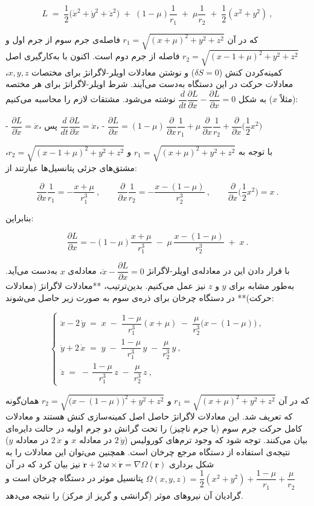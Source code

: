 $$
L \;=\; \dfrac{1}{2}\Big(\dot{x}^2+\dot{y}^2+\dot{z}^2\Big)\;+\;(1-\mu)\dfrac{1}{r_1}\;+\;\mu\dfrac{1}{r_2}\;+\;\dfrac{1}{2}(x^2+y^2)~,
$$

که در آن $r_1=\sqrt{(x+\mu)^2+y^2+z^2}$ فاصله‌ی جرم سوم از جرم اول و $r_2=\sqrt{(x-1+\mu)^2+y^2+z^2}$ فاصله از جرم دوم است. اکنون با به‌کارگیری اصل کمینه‌کردن کنش ($\delta S=0$) و نوشتن معادلات اویلر-لاگرانژ برای مختصات $x, y, z$، معادلات حرکت در این دستگاه به‌دست می‌آیند. شرط اویلر-لاگرانژ برای هر مختصه (مثلاً $x$) به شکل $\dfrac{d}{dt}\dfrac{\partial L}{\partial \dot{x}} - \dfrac{\partial L}{\partial x}=0$ نوشته می‌شود. مشتقات لازم را محاسبه می‌کنیم:

- $\displaystyle \dfrac{\partial L}{\partial \dot{x}} = \dot{x}$، پس $\dfrac{d}{dt}\dfrac{\partial L}{\partial \dot{x}} = \ddot{x}$،  
- $\displaystyle \dfrac{\partial L}{\partial x} = (1-\mu)\,\dfrac{\partial}{\partial x}\dfrac{1}{r_1} + \mu\,\dfrac{\partial}{\partial x}\dfrac{1}{r_2} + \dfrac{\partial}{\partial x}\Big(\dfrac{1}{2}x^2\Big)$ 

با توجه به $r_1=\sqrt{(x+\mu)^2+y^2+z^2}$ و $r_2=\sqrt{(x-1+\mu)^2+y^2+z^2}$، مشتق‌های جزئی پتانسیل‌ها عبارتند از:

$$ 
\dfrac{\partial}{\partial x}\dfrac{1}{r_1} = -\dfrac{x+\mu}{r_1^3}~, \qquad 
\dfrac{\partial}{\partial x}\dfrac{1}{r_2} = -\dfrac{x-(1-\mu)}{r_2^3}~, \qquad 
\dfrac{\partial}{\partial x}\Big(\dfrac{1}{2}x^2\Big) = x~. 
$$

بنابراین:

$$ 
\dfrac{\partial L}{\partial x} = -(1-\mu)\dfrac{x+\mu}{r_1^3} \;-\; \mu\,\dfrac{x-(1-\mu)}{r_2^3} \;+\; x~. 
$$

با قرار دادن این در معادله‌ی اویلر-لاگرانژ $\ddot{x} - \dfrac{\partial L}{\partial x}=0$، معادله‌ی $x$ به‌دست می‌آید. به‌طور مشابه برای $y$ و $z$ نیز عمل می‌کنیم. بدین‌ترتیب، **معادلات لاگرانژ (معادلات حرکت)** در دستگاه چرخان برای ذره‌ی سوم به صورت زیر حاصل می‌شوند:

$$ 
\begin{cases}
	\displaystyle \ddot{x} - 2\,\dot{y} \;=\; x \;-\; \dfrac{1-\mu}{r_1^3}(x+\mu) \;-\; \dfrac{\mu}{r_2^3}\Big(x-(1-\mu)\Big)~,  \\[2ex]
	\displaystyle \ddot{y} + 2\,\dot{x} \;=\; y \;-\; \dfrac{1-\mu}{r_1^3}\,y \;-\; \dfrac{\mu}{r_2^3}\,y~,  \\[2ex]
	\displaystyle \ddot{z} \;=\; -\,\dfrac{1-\mu}{r_1^3}\,z \;-\; \dfrac{\mu}{r_2^3}\,z~, 
\end{cases}
$$

که در آن $r_1=\sqrt{(x+\mu)^2+y^2+z^2}$ و $r_2=\sqrt{\big(x-(1-\mu)\big)^2+y^2+z^2}$ همان‌گونه که تعریف شد. این معادلات لاگرانژ حاصل اصل کمینه‌سازی کنش هستند و معادلات کامل حرکت جرم سوم (با جرم ناچیز) را تحت گرانش دو جرم اولیه در حالت دایره‌ای بیان می‌کنند. توجه شود که وجود ترم‌های کورولیس ($2\,\dot{y}$ در معادله $x$ و $2\,\dot{x}$ در معادله $y$) نتیجه‌ی استفاده از دستگاه مرجع چرخان است. همچنین می‌توان این معادلات را به شکل برداری $ \ddot{\mathbf{r}} + 2\,\mathbf{\omega}\times \dot{\mathbf{r}} = \nabla \Omega(\mathbf{r})$ نیز بیان کرد که در آن $\Omega(x,y,z) = \dfrac{1}{2}(x^2+y^2) + \dfrac{1-\mu}{r_1} + \dfrac{\mu}{r_2}$ پتانسیل موثر در دستگاه چرخان است و گرادیان آن نیروهای موثر (گرانشی و گریز از مرکز) را نتیجه می‌دهد.

